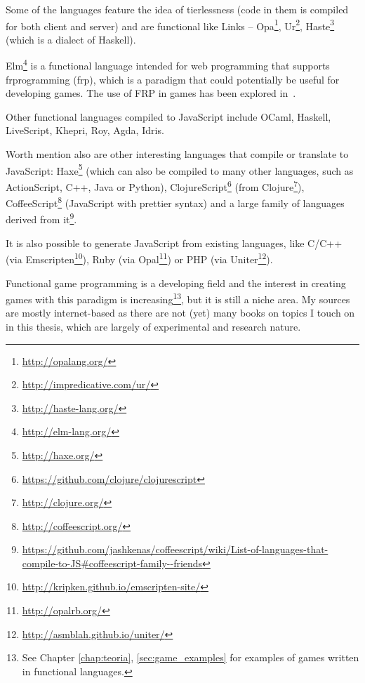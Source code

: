 Some of the languages feature the idea of tierlessness (code in them is compiled for both client and server) and are functional like Links -- Opa\footnote{\url{http://opalang.org/}}, Ur\footnote{\url{http://impredicative.com/ur/}}, Haste\footnote{\url{http://haste-lang.org/}} (which is a dialect of Haskell).

Elm\footnote{\url{http://elm-lang.org/}} is a functional language intended for web programming that supports \gls{frprogramming} (\acrshort{frp}), which is a paradigm that could potentially be useful for developing games. The use of FRP in games has been explored in~\cite{munc_thesis}.

Other functional languages compiled to JavaScript include OCaml, Haskell, LiveScript, Khepri, Roy, Agda, Idris.


Worth mention also are other interesting languages that compile or translate to JavaScript: Haxe\footnote{\url{http://haxe.org/}} (which can also be compiled to many other languages, such as ActionScript, C++, Java or Python), ClojureScript\footnote{\url{https://github.com/clojure/clojurescript}} (from Clojure\footnote{\url{http://clojure.org/}}), CoffeeScript\footnote{\url{http://coffeescript.org/}} (JavaScript with prettier syntax) and a large family of languages derived from it\footnote{\url{https://github.com/jashkenas/coffeescript/wiki/List-of-languages-that-compile-to-JS\#coffeescript-family--friends}}.

It is also possible to generate JavaScript from existing languages, like C/C++ (via Emscripten\footnote{\url{http://kripken.github.io/emscripten-site/}}), Ruby (via Opal\footnote{\url{http://opalrb.org/}}) or PHP (via Uniter\footnote{\url{http://asmblah.github.io/uniter/}}).


Functional game programming is a developing field and the interest in creating games with this paradigm is increasing\footnote{See Chapter \ref{chap:teoria}, \ref{sec:game_examples} for examples of games written in functional languages.}, but it is still a niche area. My sources are mostly internet-based as there are not (yet) many books on topics I touch on in this thesis, which are largely of experimental and research nature.

